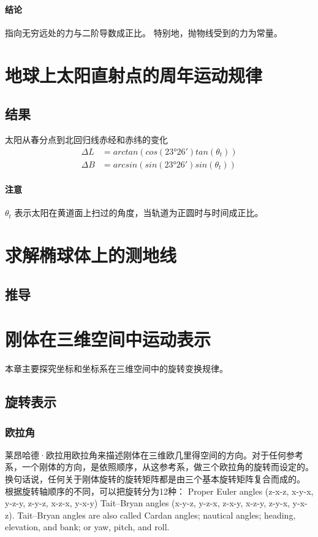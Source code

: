 \documentclass{ctexart}
\begin{document}
	\paragraph{结论}
	指向无穷远处的力与二阶导数成正比。
	特别地，抛物线受到的力为常量。
	
	
	
	\section{地球上太阳直射点的周年运动规律}
	\subsection{结果}
	太阳从春分点到北回归线赤经和赤纬的变化
	\begin{equation}
	\begin{split}
	\varDelta L &= arctan(cos(23°26') tan(\theta_t)) \\
	\varDelta B &= arcsin(sin(23°26') sin(\theta_t))
	\end{split}
	\end{equation}
	\paragraph{注意}
	$ \theta_t $ 表示太阳在黄道面上扫过的角度，当轨道为正圆时与时间成正比。
	
	
	\section{求解椭球体上的测地线}
	\subsection{推导}
	
	
	\section{刚体在三维空间中运动表示}
	本章主要探究坐标和坐标系在三维空间中的旋转变换规律。
	\subsection{旋转表示}
	\subsubsection{欧拉角}
	莱昂哈德·欧拉用欧拉角来描述刚体在三维欧几里得空间的方向。对于任何参考系，一个刚体的方向，是依照顺序，从这参考系，做三个欧拉角的旋转而设定的。换句话说，任何关于刚体旋转的旋转矩阵都是由三个基本旋转矩阵复合而成的。
	\\\indent
	根据旋转轴顺序的不同，可以把旋转分为12种：
	Proper Euler angles (z-x-z, x-y-x, y-z-y, z-y-z, x-z-x, y-x-y)
	Tait–Bryan angles (x-y-z, y-z-x, z-x-y, x-z-y, z-y-x, y-x-z).
	Tait–Bryan angles are also called Cardan angles; nautical angles; heading, elevation, and bank; or yaw, pitch, and roll.
\end{document}
